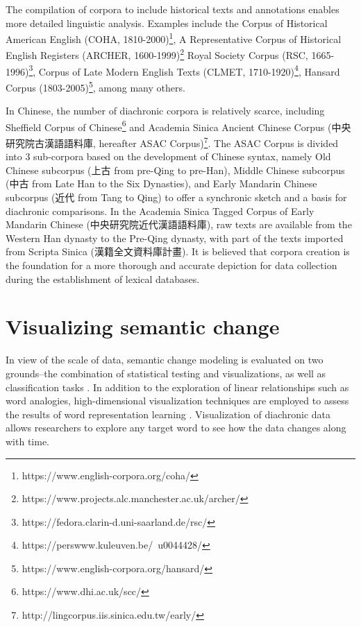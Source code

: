 The compilation of corpora to include historical texts and annotations enables more detailed linguistic analysis. Examples include
the Corpus of Historical American English (COHA, 1810-2000)\footnote{https://www.english-corpora.org/coha/}, 
A Representative Corpus of Historical English Registers (ARCHER, 1600-1999)\footnote{https://www.projects.alc.manchester.ac.uk/archer/}
Royal Society Corpus (RSC, 1665-1996)\footnote{https://fedora.clarin-d.uni-saarland.de/rsc/}, 
Corpus of Late Modern English Texts (CLMET, 1710-1920)\footnote{https://perswww.kuleuven.be/~u0044428/}, 
Hansard Corpus (1803-2005)\footnote{https://www.english-corpora.org/hansard/}, among many others.

In Chinese, the number of diachronic corpora is relatively scarce, including Sheffield Corpus of Chinese\footnote{https://www.dhi.ac.uk/scc/} and Academia Sinica Ancient Chinese Corpus (中央研究院古漢語語料庫, hereafter ASAC Corpus)\footnote{http://lingcorpus.iis.sinica.edu.tw/early/}. The ASAC Corpus is divided into 3 sub-corpora based on the development of Chinese syntax, namely Old Chinese subcorpus (上古 from pre-Qing to pre-Han), Middle Chinese subcorpus (中古 from Late Han to the Six Dynasties), and Early Mandarin Chinese subcorpus (近代 from Tang to Qing) to offer a synchronic sketch and a basis for diachronic comparisons. In the Academia Sinica Tagged Corpus of Early Mandarin Chinese (中央研究院近代漢語語料庫), raw texts are available from the Western Han dynasty to the Pre-Qing dynasty, with part of the texts imported from Scripta Sinica (漢籍全文資料庫計畫). It is believed that corpora creation is the foundation for a more thorough and accurate depiction for data collection during the establishment of lexical databases.

\section{Visualizing semantic change}
In view of the scale of data, semantic change modeling is evaluated on two grounds--the combination of statistical testing and visualizations, as well as classification tasks \parencite{tang2018state}. In addition to the exploration of linear relationships such as word analogies, high-dimensional visualization techniques are employed to assess the results of word representation learning \parencite{liu2017visual}. Visualization of diachronic data allows researchers to explore any target word to see how the data changes along with time.

